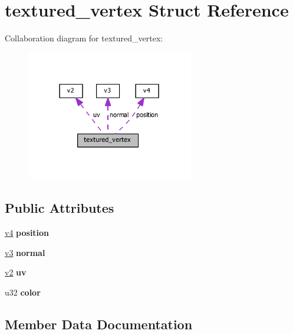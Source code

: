 \hypertarget{structtextured__vertex}{}\section{textured\+\_\+vertex Struct Reference}
\label{structtextured__vertex}


Collaboration diagram for textured\+\_\+vertex\+:\nopagebreak
\begin{figure}[H]
\begin{center}
\leavevmode
\includegraphics[width=207pt]{structtextured__vertex__coll__graph}
\end{center}
\end{figure}
\subsection*{Public Attributes}
\begin{DoxyCompactItemize}
\item 
\mbox{\label{structtextured__vertex_a3c4cd89155276901e97abbea671a5dc3}} 
\hyperlink{unionv4}{v4} {\bfseries position}
\item 
\mbox{\label{structtextured__vertex_a0d7951149447a90843f0474a1f5601ff}} 
\hyperlink{unionv3}{v3} {\bfseries normal}
\item 
\mbox{\label{structtextured__vertex_a4301365e41e35082f64868b6ee5193ff}} 
\hyperlink{unionv2}{v2} {\bfseries uv}
\item 
\mbox{\label{structtextured__vertex_a73cb353055372f5bd1f42d0dc0802eb2}} 
u32 {\bfseries color}
\end{DoxyCompactItemize}


\subsection{Member Data Documentation}
\mbox{\label{structtextured__vertex_a73cb353055372f5bd1f42d0dc0802eb2}} 
